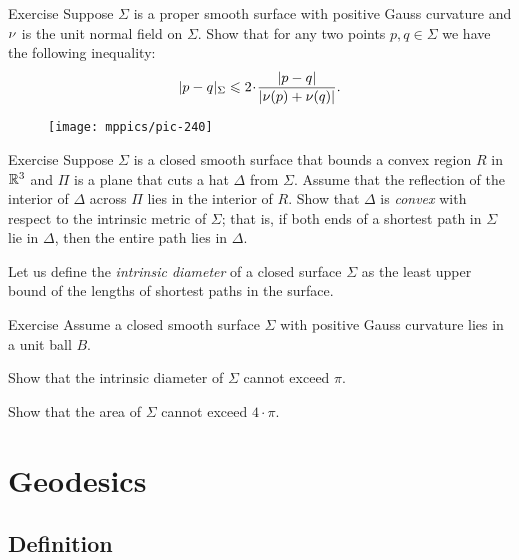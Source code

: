 \begin{thm}{Exercise}\label{ex:length-dist-conv}
Suppose $\Sigma$ is a proper smooth surface with positive Gauss curvature and $\nu$ is the unit normal field on $\Sigma$.
Show that for any two points $p,q\in \Sigma$ we have the following inequality:
\[|p-q|_\Sigma\le 2\cdot \frac{|p-q|}{|\Norm(p)+\Norm(q)|}.\]

\end{thm}


\begin{wrapfigure}{r}{27 mm}
\vskip-10mm
\centering
\texttt{[image: mppics/pic-240]}
\end{wrapfigure}

\begin{thm}{Exercise}\label{ex:hat-convex}
Suppose $\Sigma$ is a closed smooth surface that bounds a convex region $R$ 
in $\mathbb{R}^3$
and $\Pi$ is a plane that cuts a hat $\Delta$ from $\Sigma$.
Assume that the reflection of the interior of $\Delta$ across $\Pi$ lies in the interior of $R$.
Show that $\Delta$ is \emph{convex} with respect to the intrinsic metric  of $\Sigma$;
that is, 
if both ends of a shortest path in $\Sigma$ 
lie in $\Delta$,
then the entire path lies in $\Delta$.
\end{thm}


Let us define the \emph{intrinsic diameter} of a closed surface $\Sigma$ as the least upper bound of the lengths of shortest paths in the surface.

\begin{thm}{Exercise}\label{ex:intrinsic-diameter}
Assume a closed smooth surface $\Sigma$ with positive Gauss curvature lies in a unit ball $B$.

\begin{subthm}{} Show that the intrinsic diameter of $\Sigma$ cannot exceed $\pi$.
 
\end{subthm}

\begin{subthm}{}
Show that the area of $\Sigma$ cannot exceed $4\cdot \pi$.
\end{subthm}

\end{thm}

\chapter{Geodesics}
\label{chap:geodesics}

\section{Definition}

